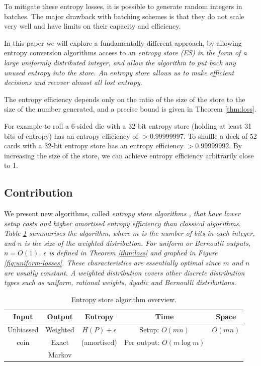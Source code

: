 \documentclass[12pt]{article}
\begin{document}
To mitigate these entropy losses, it is possible to generate random integers in batches. The major drawback with batching schemes is that they do not scale very well and have limits on their capacity and efficiency.

In this paper we will explore a fundamentally different approach, by allowing entropy conversion algorithms access to an \em entropy store \em (ES) in the form of a large uniformly distributed integer, and allow the algorithm to put back any unused entropy into the store. An entropy store allows us to make efficient decisions and recover almost all lost entropy.

The entropy efficiency depends only on the ratio of the size of the store to the size of the number generated, and a precise bound is given in Theorem \ref{thm:loss}. 

For example to roll a 6-sided die with a 32-bit entropy store (holding at least 31 bits of entropy) has an entropy efficiency of $>0.99999997$. To shuffle a deck of 52 cards with a 32-bit entropy store has an entropy efficiency $>0.99999992$. By increasing the size of the store, we can achieve entropy efficiency arbitrarily close to 1.


\subsection {Contribution}

We present new algorithms, called \em entropy store algorithms \em, that have lower setup costs and higher amortised entropy efficiency than classical algorithms. Table \ref{tab:entropy-store} summarises the algorithm, where $m$ is the number of bits in each integer, and $n$ is the size of the weighted distribution. For uniform or Bernoulli outputs, $n=O(1)$. $\epsilon$ is defined in Theorem \ref{thm:loss} and graphed in Figure \ref{fig:uniform-losses}. These characteristics are essentially optimal since $m$ and $n$ are usually constant.  A weighted distribution covers other discrete distribution types such as uniform, rational weights, dyadic and Bernoulli distributions.

\begin{table}[h!]
\centering
\begin{tabular}{|c|c|c|c|c|}
\hline
Input & Output & Entropy & Time & Space \\
\hline
Unbiassed & Weighted & $H(P)+\epsilon$ & Setup: $O(mn)$ & $O(mn)$ \\
coin & Exact & (amortised) & Per output: $O(m \log m)$  &  \\
 & Markov &  &   & \\
\hline
\end{tabular}
\caption{Entropy store algorithm overview.}
    \label{tab:entropy-store}
\end{table}
\end{document}
